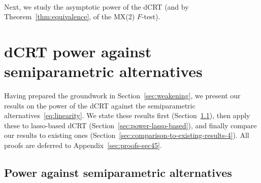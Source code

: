 \documentclass[12pt]{article}
\theoremstyle{definition}
\theoremstyle{remark}
\newcommand{\prx}{\bm X}
\newcommand{\prz}{\bm Z}
\newcommand{\pry}{{\bm Y}}
\begin{document}
\paragraph{}

Next, we study the asymptotic power of the dCRT (and by Theorem~\ref{thm:equivalence}, of the MX(2) $F$-test). 

%	


\section{dCRT power against semiparametric alternatives} \label{sec:asymptotic-power}

Having prepared the groundwork in Section~\ref{sec:weakening}, we present our results on the power of the dCRT against the semiparametric alternatives~\eqref{eq:linearity}. We state these results first (Section~\ref{sec:power-results}), then apply these to lasso-based dCRT (Section~\ref{sec:power-lasso-based}), and finally compare our results to existing ones (Section~\ref{sec:comparison-to-existing-results-4}). All proofs are deferred to Appendix~\ref{sec:proofs-sec45}.

\subsection{Power against semiparametric alternatives} \label{sec:power-results}
\end{document}
